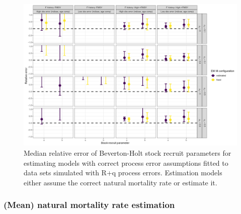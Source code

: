 \documentclass[
  12pt,
]{article}
\begin{document}
\begin{landscape}
\begin{figure}
\caption{Median relative error of Beverton-Holt stock recruit parameters for estimating models with correct process error assumptions fitted to data sets simulated with R+q process errors. Estimation models either assume the correct natural mortality rate or estimate it.}\label{q_om_SR_relbias}
\begin{center}
\includegraphics[width = \textwidth]{q_om_SR_relerror.png}
\end{center}
\end{figure}
\end{landscape}

\hypertarget{mean-natural-mortality-rate-estimation}{%
\subsubsection{(Mean) natural mortality rate
estimation}\label{mean-natural-mortality-rate-estimation}}
\end{document}
